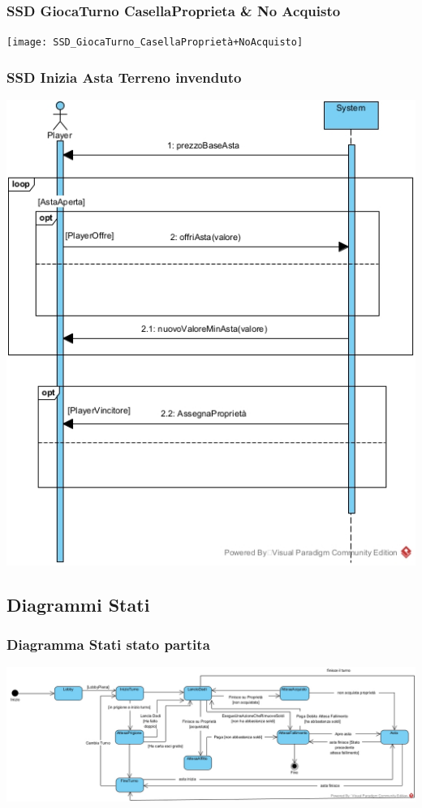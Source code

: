 \documentclass{article}
\begin{document}
\subsubsection{SSD GiocaTurno CasellaProprieta \& No Acquisto}
\texttt{[image: SSD\_GiocaTurno\_CasellaProprietà+NoAcquisto]}
\subsubsection{SSD Inizia Asta Terreno invenduto}
\includegraphics[width=\textwidth]{SSD_IniziaAsta_Invenduta}


\subsection{Diagrammi Stati}
\subsubsection{Diagramma Stati stato partita}
\includegraphics[width=\textwidth]{DiagrammaStatiStatoPartita}
\end{document}
